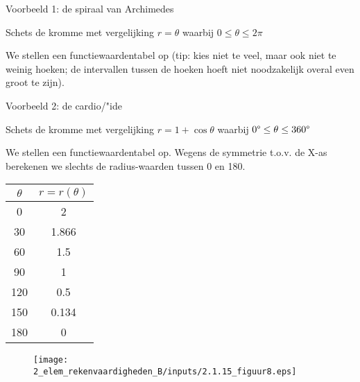 Voorbeeld 1: de spiraal van Archimedes

Schets de kromme met vergelijking $r=\theta$ waarbij $0\leq\theta\leq2\pi$

We stellen een functiewaardentabel op (tip: kies niet te veel, maar
ook niet te weinig hoeken; de intervallen tussen de hoeken hoeft niet
noodzakelijk overal even groot te zijn).



Voorbeeld 2: de cardio/"ide

Schets de kromme met vergelijking $r=1+\cos\theta$ waarbij $0\text{\textdegree}\leq\theta\leq360\text{\textdegree}$

We stellen een functiewaardentabel op. Wegens de symmetrie t.o.v.
de X-as berekenen we slechts de radius-waarden tussen 0\textdegree{}
en 180\textdegree .

\begin{minipage}{5\linewidth}
\begin{tabular}{|c|c|}
\hline 
$\theta$ & $r=r(\theta)$\\
\hline 
\hline 
0\textdegree{} & 2\\
\hline 
30\textdegree{} & 1.866\\
\hline 
60\textdegree{} & 1.5\\
\hline 
90\textdegree{} & 1\\
\hline 
120\textdegree{} & 0.5\\
\hline 
150\textdegree{} & 0.134\\
\hline 
180\textdegree{} & 0\\
\hline 
\end{tabular}
\end{minipage}
\begin{minipage}{.5\linewidth}
	\begin{figure}
	\texttt{[image: 2\_elem\_rekenvaardigheden\_B/inputs/2.1.15\_figuur8.eps]}
	\end{figure}
\end{minipage} 

